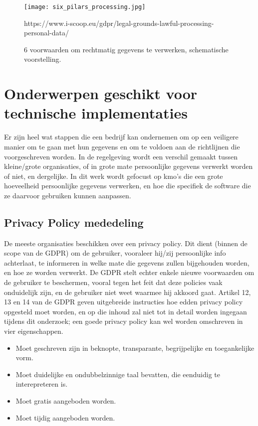 \begin{figure}[h]
    \centering
    \texttt{[image: six\_pilars\_processing.jpg]}
    \caption{6 voorwaarden om rechtmatig gegevens te verwerken, schematische voorstelling.}
    https://www.i-scoop.eu/gdpr/legal-grounds-lawful-processing-personal-data/
\end{figure}


\section{Onderwerpen geschikt voor technische implementaties}

Er zijn heel wat stappen die een bedrijf kan ondernemen om op een veiligere manier om te gaan met hun gegevens en om te voldoen aan de richtlijnen die voorgeschreven worden. 
In de regelgeving wordt een verschil gemaakt tussen kleine/grote organisaties, of in grote mate persoonlijke gegevens verwerkt worden of niet, en dergelijke. In dit werk wordt gefocust op kmo's die een grote hoeveelheid persoonlijke gegevens verwerken, en hoe die specifiek de software die ze daarvoor gebruiken kunnen aanpassen. 

\subsection{Privacy Policy mededeling}
De meeste organisaties beschikken over een privacy policy. Dit dient (binnen de scope van de GDPR) om de gebruiker, vooraleer hij/zij persoonlijke info achterlaat, te informeren in welke mate die gegevens zullen bijgehouden worden, en hoe ze worden verwerkt. De GDPR stelt echter enkele nieuwe voorwaarden om de gebruiker te beschermen, vooral tegen het feit dat deze policies vaak onduidelijk zijn, en de gebruiker niet weet waarmee hij akkoord gaat.
Artikel 12, 13 en 14 van de GDPR geven uitgebreide instructies hoe edden privacy policy opgesteld moet worden, en op die inhoud zal niet tot in detail worden ingegaan tijdens dit onderzoek; een goede privacy policy kan wel worden omschreven in vier eigenschappen. 

\begin{itemize}
	\item Moet geschreven zijn in beknopte, transparante, begrijpelijke en toegankelijke vorm.
	\item Moet duidelijke en ondubbelzinnige taal bevatten, die eenduidig te interepreteren is. 
	\item Moet gratis aangeboden worden.
	\item Moet tijdig aangeboden worden.
\end{itemize}

